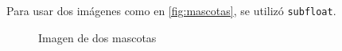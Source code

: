 Para usar dos imágenes como en \autoref{fig:mascotas}, se utilizó \texttt{subfloat}.
\begin{figure}[h]
	\centering
	\hfill
	\caption{Imagen de dos mascotas}
	\label{fig:mascotas}
\end{figure}